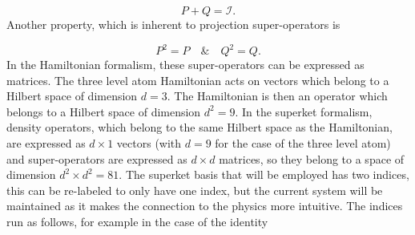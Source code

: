 \documentclass[12pt]{article}
\begin{document}
\begin{equation}\label{eq:ProyectorPropertyIdentity}
    P+Q = \mathcal{I}.
\end{equation} Another property, which is inherent to projection super-operators is

\begin{equation}
    P^2 = P \quad \& \quad Q^2 = Q.
\end{equation} In the Hamiltonian formalism, these super-operators can be expressed as matrices. The three level atom Hamiltonian acts on vectors which belong to a Hilbert space of dimension $d = 3$. The Hamiltonian is then an operator which belongs to a Hilbert space of dimension $d^2 = 9$. In the superket formalism, density operators, which belong to the same Hilbert space as the Hamiltonian, are expressed as $d \times 1$ vectors (with $d=9$ for the case of the three level atom) and super-operators are expressed as $d \times d$ matrices, so they belong to a space of dimension $d^2 \times d^2 = 81$. The superket basis that will be employed has two indices, this can be re-labeled to only have one index, but the current system will be maintained as it makes the connection to the physics more intuitive. The indices run as follows, for example in the case of the identity
\end{document}

